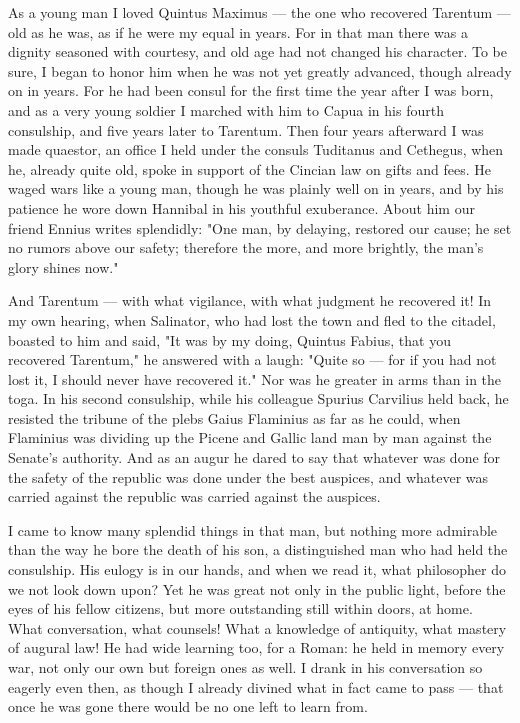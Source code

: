  As a young man I loved Quintus Maximus — the one who recovered Tarentum — old as he was, as if he were my equal in years. For in that man there was a dignity seasoned with courtesy, and old age had not changed his character. To be sure, I began to honor him when he was not yet greatly advanced, though already on in years. For he had been consul for the first time the year after I was born, and as a very young soldier I marched with him to Capua in his fourth consulship, and five years later to Tarentum. Then four years afterward I was made quaestor, an office I held under the consuls Tuditanus and Cethegus, when he, already quite old, spoke in support of the Cincian law on gifts and fees. He waged wars like a young man, though he was plainly well on in years, and by his patience he wore down Hannibal in his youthful exuberance. About him our friend Ennius writes splendidly: "One man, by delaying, restored our cause; he set no rumors above our safety; therefore the more, and more brightly, the man's glory shines now."

 And Tarentum — with what vigilance, with what judgment he recovered it! In my own hearing, when Salinator, who had lost the town and fled to the citadel, boasted to him and said, "It was by my doing, Quintus Fabius, that you recovered Tarentum," he answered with a laugh: "Quite so — for if you had not lost it, I should never have recovered it." Nor was he greater in arms than in the toga. In his second consulship, while his colleague Spurius Carvilius held back, he resisted the tribune of the plebs Gaius Flaminius as far as he could, when Flaminius was dividing up the Picene and Gallic land man by man against the Senate's authority. And as an augur he dared to say that whatever was done for the safety of the republic was done under the best auspices, and whatever was carried against the republic was carried against the auspices.

 I came to know many splendid things in that man, but nothing more admirable than the way he bore the death of his son, a distinguished man who had held the consulship. His eulogy is in our hands, and when we read it, what philosopher do we not look down upon? Yet he was great not only in the public light, before the eyes of his fellow citizens, but more outstanding still within doors, at home. What conversation, what counsels! What a knowledge of antiquity, what mastery of augural law! He had wide learning too, for a Roman: he held in memory every war, not only our own but foreign ones as well. I drank in his conversation so eagerly even then, as though I already divined what in fact came to pass — that once he was gone there would be no one left to learn from.

